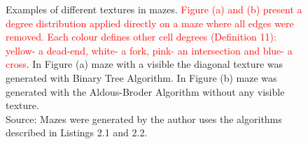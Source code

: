 \begin{figure}[!h]
\begin{subfigure}{0.4\textwidth}
    \caption{}
    \end{subfigure}
    \caption{Examples of different textures in mazes. \textcolor{red}{Figure (a) and (b) present a degree distribution applied directly on a maze where all edges were removed.
    Each colour defines other cell degrees (Definition 11): yellow- a dead-end, white- a fork, pink- an intersection and blue- a cross}. In Figure (a) maze with a visible
    the diagonal texture was generated with Binary Tree Algorithm. In Figure (b) maze was generated with the Aldous-Broder Algorithm without any visible texture.\\Source: Mazes were generated by
    the author uses the algorithms described in Listings 2.1 and 2.2.}
    \end{figure}
